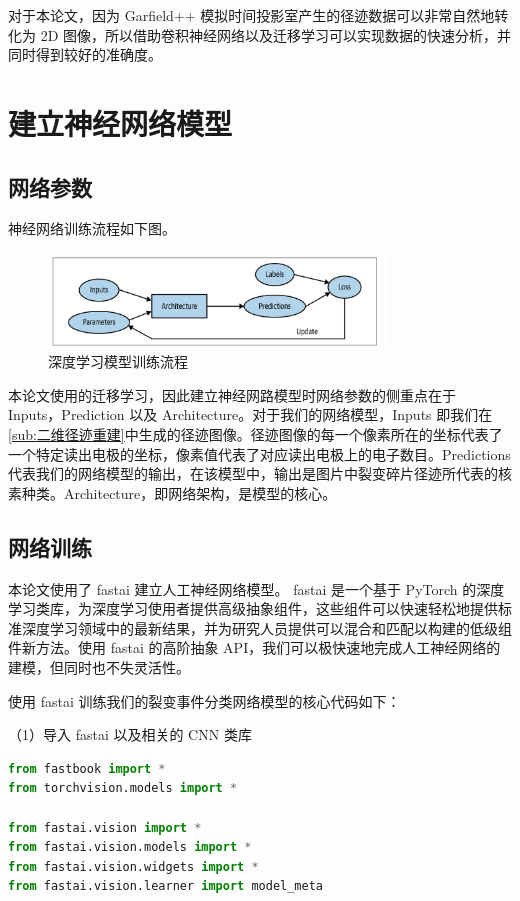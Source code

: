\documentclass[AutoFakeBold]{LZUThesis}
\begin{document}
对于本论文，因为 Garfield++ 模拟时间投影室产生的径迹数据可以非常自然地转化为 2D 图像，所以借助卷积神经网络以及迁移学习可以实现数据的快速分析，并同时得到较好的准确度。




\section{建立神经网络模型}
\subsection{网络参数}
神经网络训练流程如下图。

\begin{figure}[H]
    \centering
    \includegraphics[width=0.8\textwidth]{figures/deep-learning.png}
    \caption{深度学习模型训练流程}
    \label{fig_deep-learning}
\end{figure}


本论文使用的迁移学习，因此建立神经网路模型时网络参数的侧重点在于 Inputs，Prediction 以及 Architecture。对于我们的网络模型，Inputs 即我们在 \ref{sub:二维径迹重建}中生成的径迹图像。径迹图像的每一个像素所在的坐标代表了一个特定读出电极的坐标，像素值代表了对应读出电极上的电子数目。Predictions 代表我们的网络模型的输出，在该模型中，输出是图片中裂变碎片径迹所代表的核素种类。Architecture，即网络架构，是模型的核心。


\subsection{网络训练}
本论文使用了 fastai\cite{howard2020fastai} 建立人工神经网络模型。
fastai 是一个基于 PyTorch 的深度学习类库，为深度学习使用者提供高级抽象组件，这些组件可以快速轻松地提供标准深度学习领域中的最新结果，并为研究人员提供可以混合和匹配以构建的低级组件新方法。使用 fastai 的高阶抽象 API，我们可以极快速地完成人工神经网络的建模，但同时也不失灵活性。

使用 fastai 训练我们的裂变事件分类网络模型的核心代码如下：

（1）导入 fastai 以及相关的 CNN 类库
\begin{lstlisting}[language = python]
from fastbook import *
from torchvision.models import *

from fastai.vision import *
from fastai.vision.models import *
from fastai.vision.widgets import *
from fastai.vision.learner import model_meta
\end{lstlisting}
\end{document}
